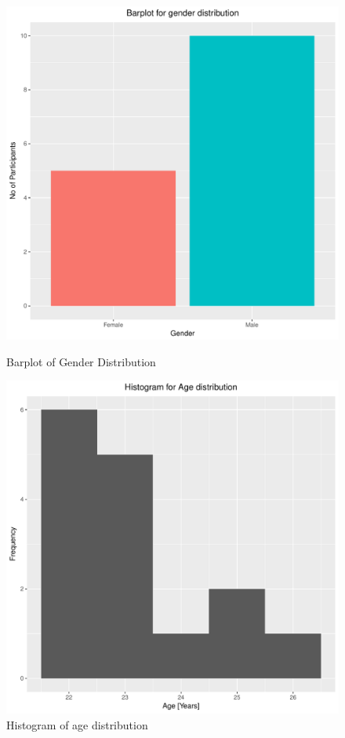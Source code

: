\documentclass[12pt,epsf]{report}
\begin{document}
{\begin{figure}[!htb]
	\begin{minipage}[c]{0.5\linewidth}
	\includegraphics[width=\linewidth]{1_gender.pdf}
	\caption{Barplot of Gender Distribution}
	\end{minipage}
	\hfill
	\begin{minipage}[c]{0.5\linewidth}
	\includegraphics[width=\linewidth]{1_age.pdf}
	\caption{Histogram of age distribution}
	\end{minipage}
\end{figure}
\FloatBarrier
}
\end{document}
